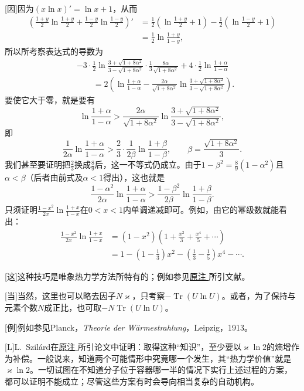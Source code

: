 \documentclass[fontsize=13pt,twoside,openany,headings=normal,parskip=false,bookmarkpackage=false,DIV=calc]{scrbook}
\begin{document}
[因]{\hypertarget{origpage-261}{}\label{origpage-261}因为$(x\ln x)'=\ln x+1$，从而
\begin{align*}
\left(\frac{1+y}2\ln\frac{1+y}2+\frac{1-y}2\ln\frac{1-y}2\right)'
&=\frac12\left(\ln\frac{1+y}2+1\right)-\frac12\left(\ln\frac{1-y}2+1\right)\\
&=\frac12\ln\frac{1+y}{1-y},
\end{align*}
所以所考察表达式的导数为
\begin{align*}
&-3\cdot\frac12\ln\frac{3+\sqrt{1+8\alpha^2}}{3-\sqrt{1+8\alpha^2}}
\cdot\frac13\frac{8\alpha}{\sqrt{1+8\alpha^2}}+4\cdot\frac12\ln\frac{1+\alpha}{1-\alpha}\\
&\qquad=2\left(\ln\frac{1+\alpha}{1-\alpha}
-\frac{2\alpha}{\sqrt{1+8\alpha^2}}\ln\frac{3+\sqrt{1+8\alpha^2}}{3-\sqrt{1+8\alpha^2}}\right).
\end{align*}
要使它大于零，就是要有
\[
\ln\frac{1+\alpha}{1-\alpha}>
\frac{2\alpha}{\sqrt{1+8\alpha^2}}\ln\frac{3+\sqrt{1+8\alpha^2}}{3-\sqrt{1+8\alpha^2}},
\]
即
\[
\frac1{2\alpha}\ln\frac{1+\alpha}{1-\alpha}>
\frac23\cdot\frac1{2\beta}\ln\frac{1+\beta}{1-\beta},
\qquad\beta=\frac{\sqrt{1+8\alpha^2}}3.
\]
我们甚至要证明把$\frac23$换成$\frac89$后，这一不等式仍成立。由于$1-\beta^2=\frac89(1-\alpha^2)$且$\alpha<\beta$（后者由前式及$\alpha<1$得出），这也就是
\[
\frac{1-\alpha^2}{2\alpha}\ln\frac{1+\alpha}{1-\alpha}>
\frac{1-\beta^2}{2\beta}\ln\frac{1+\beta}{1-\beta}.
\]
只须证明$\frac{1-x^2}{2x}\ln\frac{1+x}{1-x}$在$0<x<1$内单调递减即可。例如，由它的幂级数就能看出：
\begin{align*}
\frac{1-x^2}{2x}\ln\frac{1+x}{1-x}
&=(1-x^2)\left(1+\frac{x^2}3+\frac{x^4}5+\cdots\right)\\
&=1-\left(1-\frac13\right)x^2-\left(\frac13-\frac15\right)x^4-\cdots.
\end{align*}}

[这]{这种技巧是唯象热力学方法所特有的；例如参见\CJKglue \hyperlink{note-184}{原注 } 所引文献。}

[当]{当然，这里也可以略去因子$N\varkappa$，只考察$-\operatorname{Tr}(U\ln U)$。或者，为了保持与元素个数$N$成正比，也可取$-N\operatorname{Tr}(U\ln U)$。}

[例]{例如参见Planck，\emph{Theorie der Wärmestrahlung}，Leipzig，1913。}

[L]{L.~Szilárd在\CJKglue \hyperlink{note-194}{原注 } 所引论文中证明：取得这种“知识”，至少要以$\varkappa\ln2$的熵增作为补偿。一般说来，知道两个可能情形中究竟哪一个发生，其“热力学价值”就是$\varkappa\ln2$。一切试图在不知道分子位于容器哪一半的情况下实行上述过程的方案，都可以证明不能成立；尽管这些方案有时会导向相当复杂的自动机构。}
\end{document}
